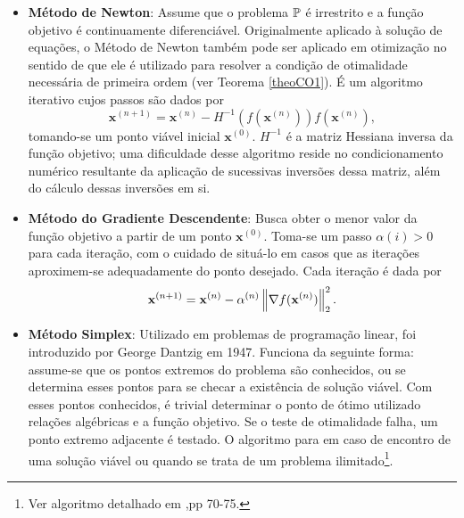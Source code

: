 \begin{itemize}
\item \textbf{M\'{e}todo de Newton}: Assume que o problema $\mathbb{P}$ \'{e} irrestrito e a fun\c{c}\~{a}o objetivo \'{e} continuamente diferenci\'{a}vel. Originalmente aplicado \`{a} solu\c{c}\~{a}o de equa\c{c}\~{o}es, o M\'{e}todo de Newton tamb\'{e}m pode ser aplicado em otimiza\c{c}\~{a}o no sentido de que ele \'{e} utilizado para resolver a condi\c{c}\~{a}o de otimalidade necess\'{a}ria de primeira ordem (ver Teorema \ref{theoCO1}). \'{E} um algoritmo iterativo cujos passos s\~{a}o dados por
\begin{equation}
\mathbf{x}^{(n+1)} = \mathbf{x}^{(n)} - H^{-1}(f(\mathbf{x}^{(n)}))f(\mathbf{x}^{(n)}),
\end{equation}
tomando-se um ponto vi\'{a}vel inicial $\mathbf{x}^{(0)}$. $H^{-1}$ \'{e} a matriz Hessiana inversa da fun\c{c}\~{a}o objetivo; uma dificuldade desse algoritmo reside no condicionamento num\'{e}rico resultante da aplica\c{c}\~{a}o de sucessivas invers\~{o}es dessa matriz, al\'{e}m do c\'{a}lculo dessas invers\~{o}es em si.

\item \textbf{M\'{e}todo do Gradiente Descendente}: Busca obter o menor valor da fun\c{c}\~{a}o objetivo a partir de um ponto $\mathbf{x}^{(0)}$. Toma-se um passo $\alpha{(i)} > 0$ para cada itera\c{c}\~{a}o, com o cuidado de situ\'{a}-lo em casos que as itera\c{c}\~{o}es aproximem-se adequadamente do ponto desejado. Cada itera\c{c}\~{a}o \'{e} dada por
\begin{equation*}
\mathbf{x}^{(n+1)} = \mathbf{x}^{(n)} - \alpha^{(n)}\left\lVert\nabla f(\mathbf{x}^{(n)})\right\rVert_{2}^{2}.
\end{equation*}

\item \textbf{M\'{e}todo Simplex}: Utilizado em problemas de programa\c{c}\~{a}o linear, foi introduzido por George Dantzig em 1947. Funciona da seguinte forma: assume-se que os pontos extremos do problema s\~{a}o conhecidos, ou se determina esses pontos para se checar a exist\^{e}ncia de solu\c{c}\~{a}o vi\'{a}vel. Com esses pontos conhecidos, \'{e} trivial determinar o ponto de \'{o}timo utilizado rela\c{c}\~{o}es alg\'{e}bricas e a fun\c{c}\~{a}o objetivo. Se o teste de otimalidade falha, um ponto extremo adjacente \'{e} testado. O algoritmo para em caso de encontro de uma solu\c{c}\~{a}o vi\'{a}vel ou quando se trata de um problema ilimitado\footnote{Ver algoritmo detalhado em \cite{yang},pp 70-75.}.


\end{itemize}
